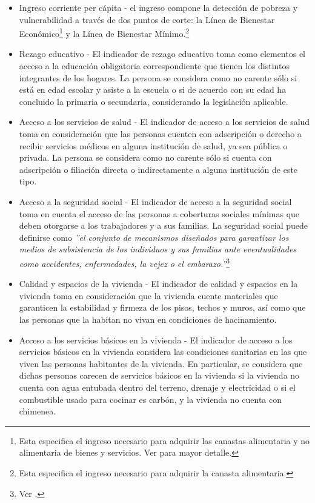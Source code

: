 \begin{itemize}
    \item Ingreso corriente per cápita - el ingreso compone la detección de pobreza y vulnerabilidad a través de dos puntos de corte: la Línea de Bienestar Económico\footnote{Esta especifica el ingreso necesario para adquirir las canastas alimentaria y no alimentaria de bienes y servicios. Ver \cite{coneval_medicion} para mayor detalle.} y la Línea de Bienestar Mínimo.\footnote{Esta especifica el ingreso necesario para adquirir la canasta alimentaria.}
    \item Rezago educativo - El indicador de rezago educativo toma como elementos el acceso a la educación obligatoria correspondiente que tienen los distintos integrantes de los hogares. La persona se considera como no carente sólo si está en edad escolar y asiste a la escuela o si de acuerdo con su edad ha concluido la primaria o secundaria, considerando la legislación aplicable.
    \item Acceso a los servicios de salud - El indicador de acceso a los servicios de salud toma en consideración que las personas cuenten con adscripción o derecho a recibir servicios médicos en alguna institución de salud, ya sea pública o privada. La persona se considera como no carente sólo si cuenta con adscripción o filiación directa o indirectamente a alguna institución de este tipo.
    \item Acceso a la seguridad social - El indicador de acceso a la seguridad social toma en cuenta el acceso de las personas a coberturas sociales mínimas que deben otorgarse a los trabajadores y a sus familias. La seguridad social puede definirse como \textit{''el conjunto de mecanismos diseñados para garantizar los medios de subsistencia de los individuos y sus familias ante eventualidades como accidentes, enfermedades, la vejez o el embarazo.''}\footnote{Ver \cite{coneval_folleto}.}
    \item Calidad y espacios de la vivienda - El indicador de calidad y espacios en la vivienda toma en consideración que la vivienda cuente materiales que garanticen la estabilidad y firmeza de los pisos, techos y muros, así como que las personas que la habitan no vivan en condiciones de hacinamiento.
    \item Acceso a los servicios básicos en la vivienda - El indicador de acceso a los servicios básicos en la vivienda considera las condiciones sanitarias en las que viven las personas habitantes de la vivienda. En particular, se considera que dichas personas carecen de servicios básicos en la vivienda si la vivienda no cuenta con agua entubada dentro del terreno, drenaje y electricidad o si el combustible usado para cocinar es carbón, y la vivienda no cuenta con chimenea.

\end{itemize}
